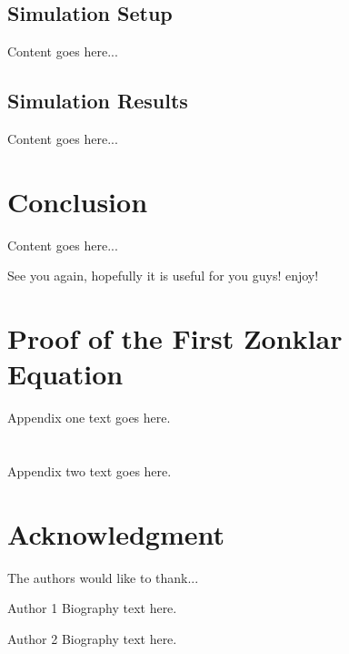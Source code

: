 \documentclass[journal]{IEEEtran}
\begin{document}
\subsection{Simulation Setup}
Content goes here... 

\subsection{Simulation Results}
Content goes here... 

\section{Conclusion}
Content goes here... 

See you again, hopefully it is useful for you guys! enjoy!

\appendices
\section{Proof of the First Zonklar Equation}
Appendix one text goes here.

\section{}
Appendix two text goes here.

\section*{Acknowledgment}

The authors would like to thank...

\ifCLASSOPTIONcaptionsoff
  \newpage
\fi


\begin{IEEEbiography}{Author 1}
Biography text here.
\end{IEEEbiography}

\begin{IEEEbiography}{Author 2}
Biography text here.
\end{IEEEbiography}

\end{document}
